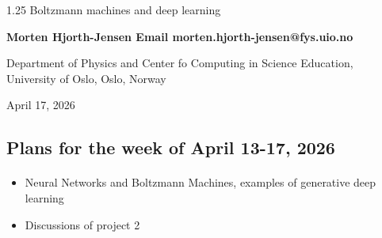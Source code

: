 \documentclass[%
oneside,                 %
final,                   %
10pt]{article}
\begin{document}

\newcommand{\exercisesection}[1]{\subsection*{#1}}






\thispagestyle{empty}

\begin{center}
{\LARGE\bf
\begin{spacing}{1.25}
Boltzmann machines and deep learning
\end{spacing}
}
\end{center}


\begin{center}
{\bf Morten Hjorth-Jensen  Email morten.hjorth-jensen@fys.uio.no}
\end{center}

    \begin{center}
\centerline{{\small Department of Physics and Center fo Computing in Science Education, University of Oslo, Oslo, Norway}}
\end{center}
    

\begin{center}
April 17, 2026
\end{center}

\vspace{1cm}


\subsection{Plans for the week of April 13-17, 2026}


\paragraph{}
\begin{itemize}
\item Neural Networks and Boltzmann Machines, examples of generative deep learning

\item Discussions of project 2
\end{itemize}
\end{document}
